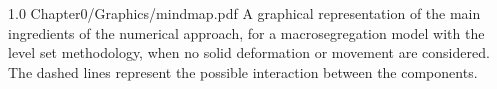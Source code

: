 
\begin{figureth}
{1.0}
{Chapter0/Graphics/mindmap.pdf}
{A graphical representation of the main ingredients of the numerical approach, 
for a macrosegregation model with the level set methodology, when no solid deformation or movement are considered. 
The dashed lines represent the possible interaction between the components.}
\label{fig:mindmap}
\end{figureth}



